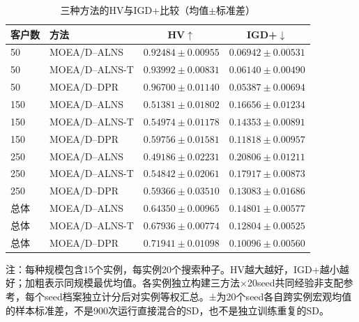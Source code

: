 \begin{table}[htbp]
\centering
\caption{三种方法的HV与IGD+比较（均值$\pm$标准差）}
\label{tab:three-method-quality}
\begin{tabular}{llcc}
\toprule
客户数 & 方法 & HV$\uparrow$ & IGD+$\downarrow$ \\
\midrule
50 & MOEA/D–ALNS & $0.92484 \pm 0.00955$ & $0.06942 \pm 0.00531$ \\
50 & MOEA/D–ALNS-T & $0.93992 \pm 0.00831$ & $0.06140 \pm 0.00490$ \\
50 & MOEA/D–DPR & $\mathbf{0.96700 \pm 0.01140}$ & $\mathbf{0.05387 \pm 0.00694}$ \\
\midrule
150 & MOEA/D–ALNS & $0.51381 \pm 0.01802$ & $0.16656 \pm 0.01234$ \\
150 & MOEA/D–ALNS-T & $0.54974 \pm 0.01178$ & $0.14353 \pm 0.00891$ \\
150 & MOEA/D–DPR & $\mathbf{0.59756 \pm 0.01581}$ & $\mathbf{0.11818 \pm 0.00957}$ \\
\midrule
250 & MOEA/D–ALNS & $0.49186 \pm 0.02231$ & $0.20806 \pm 0.01211$ \\
250 & MOEA/D–ALNS-T & $0.54842 \pm 0.02061$ & $0.17917 \pm 0.00873$ \\
250 & MOEA/D–DPR & $\mathbf{0.59366 \pm 0.03510}$ & $\mathbf{0.13083 \pm 0.01686}$ \\
\midrule
总体 & MOEA/D–ALNS & $0.64350 \pm 0.00965$ & $0.14801 \pm 0.00577$ \\
总体 & MOEA/D–ALNS-T & $0.67936 \pm 0.00774$ & $0.12804 \pm 0.00525$ \\
总体 & MOEA/D–DPR & $\mathbf{0.71941 \pm 0.01098}$ & $\mathbf{0.10096 \pm 0.00560}$ \\
\bottomrule
\end{tabular}
\par\smallskip
\begin{minipage}{0.98\linewidth}\footnotesize
注：每种规模包含15个实例，每实例20个搜索种子。HV越大越好，IGD+越小越好；加粗表示同规模最优均值。各实例独立构建三方法×20seed共同经验非支配参考，每个seed档案独立计分后对实例等权汇总。±为20个seed各自跨实例宏观均值的样本标准差，不是900次运行直接混合的SD，也不是独立训练重复的SD。
\end{minipage}
\end{table}

